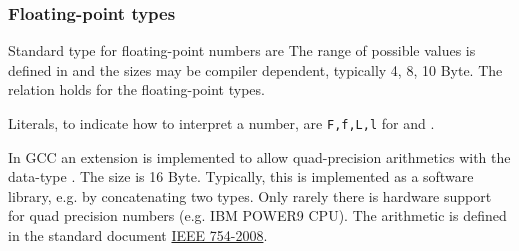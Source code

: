 \subsubsection{Floating-point types}
Standard type for floating-point numbers are
%
%
The range of possible values is defined in  and the sizes may be compiler dependent, typically 4, 8, 10 Byte. The relation
%
%
holds for the floating-point types.

Literals, to indicate how to interpret a number, are \texttt{F,f,L,l} for  and .

\begin{rem}
  In GCC an extension is implemented to allow quad-precision arithmetics with the data-type . The size is 16 Byte. Typically, this
  is implemented as a software library, e.g. by concatenating two  types. Only rarely there is hardware support for quad precision
  numbers (e.g. IBM POWER9 CPU). The arithmetic is defined in the standard document \href{https://doi.org/10.1109%2FIEEESTD.2008.4610935}{IEEE 754-2008}.
\end{rem}

